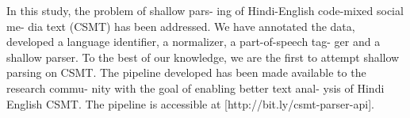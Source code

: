 In this study, the problem of shallow pars- ing of Hindi-English code-mixed social me- dia text (CSMT) has been addressed. We have annotated the data, developed a language identifier, a normalizer, a part-of-speech tag- ger and a shallow parser. To the best of our knowledge, we are the first to attempt shallow parsing on CSMT. The pipeline developed has been made available to the research commu- nity with the goal of enabling better text anal- ysis of Hindi English CSMT.  The pipeline is accessible at [http://bit.ly/csmt-parser-api].
